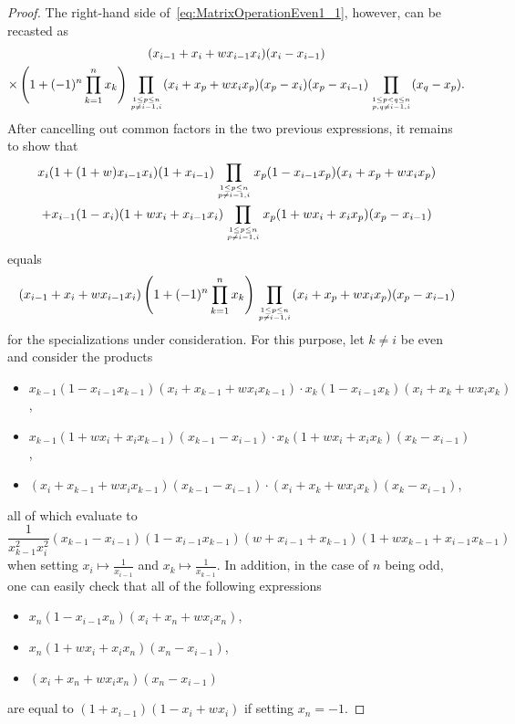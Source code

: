 \documentclass[ALCO, Unicode]{cedram}
\newcommand\myatop[2]{\genfrac{}{}{0pt}{}{#1}{#2}}
\begin{document}
\begin{proof}
		The right-hand side of~\eqref{eq:MatrixOperationEven1_1}, however, can be recasted as
		\begin{multline*}
			(x_{i-1}+x_i+w x_{i-1} x_i) (x_i-x_{i-1})\\
			\times \left(1+ (-1)^n  \prod_{k=1}^{n} x_k \right)\prod\limits_{\myatop{1 \le p \le n}{p \neq i-1,i}} (x_i+ x_p +w  x_i x_p) (x_p-x_i) (x_p-x_{i-1}) \prod_{\myatop{1 \le p <q \le n}{p,q \neq i-1,i}} (x_q -x_p).
		\end{multline*}
		After cancelling out common factors in the two previous expressions, it remains to show that
		\begin{multline*}
			x_i (1+(1+w) x_{i-1} x_i) (1+x_{i-1}) \prod_{\myatop{1 \le p \le n}{p \neq i-1,i}} x_p (1-x_{i-1} x_p)  (x_i+x_p+w x_i x_p) \\
			+ x_{i-1} (1-x_i) (1+w x_i+x_{i-1} x_i) \prod\limits_{\myatop{1 \le p \le n}{p \neq i-1,i}} x_p (1+ w x_i + x_i x_p) (x_p-x_{i-1}) 
		\end{multline*}
		equals
		\begin{equation*}
			(x_{i-1}+x_i+w x_{i-1} x_i) \left(1+ (-1)^n \prod_{k=1}^{n} x_k \right)\prod\limits_{\myatop{1 \le p \le n}{p \neq i-1,i}} (x_i+ x_p +w  x_i x_p) (x_p-x_{i-1}) 
		\end{equation*}
		for the specializations under consideration. For this purpose, let $k \neq i$ be even and consider the products
		\begin{itemize}
			\item $x_{k-1} (1-x_{i-1} x_{k-1})  (x_i+x_{k-1}+w x_i x_{k-1}) \cdot x_{k} (1-x_{i-1} x_{k})  (x_i+x_{k}+w x_i x_{k})$,
			\item $x_{k-1} (1+ w x_i + x_i x_{k-1}) (x_{k-1}-x_{i-1}) \cdot x_{k} (1+ w x_i + x_i x_{k}) (x_{k}-x_{i-1})$,
			\item $(x_i+ x_{k-1} +w  x_i x_{k-1}) (x_{k-1}-x_{i-1}) \cdot (x_i+ x_{k} +w  x_i x_{k}) (x_{k}-x_{i-1})$,
		\end{itemize}
		all of which evaluate to
		\begin{equation*}
			\frac{1}{x_{k-1}^2 x_i^2} (x_{k-1}-x_{i-1})(1-x_{i-1} x_{k-1})(w+x_{i-1}+x_{k-1})(1+w x_{k-1}+x_{i-1} x_{k-1})
		\end{equation*}
		when setting $x_i \mapsto \frac{1}{x_{i-1}}$ and $x_k \mapsto \frac{1}{x_{k-1}}$. In addition, in the case of $n$ being odd, one can easily check that all of the following expressions
		\begin{itemize}
			\item $x_{n} (1-x_{i-1} x_{n})  (x_i+x_{n}+w x_i x_{n})$,
			\item $x_{n} (1+ w x_i + x_i x_{n}) (x_{n}-x_{i-1})$,
			\item $(x_i+ x_{n} +w  x_i x_{n}) (x_{n}-x_{i-1})$
		\end{itemize}
		are equal to $(1+x_{i-1})(1 - x_i + w x_i)$ if setting $x_n=-1$.
		

\end{proof}
\end{document}
